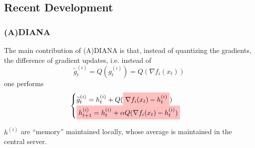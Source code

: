 
\subsection{Recent Development}


\begin{frame}
\frametitle{(A)DIANA}

The main contribution of (A)DIANA \cite{lizhize2020adiana,mishchenko2019diana} is that, instead of quantizing the gradients, the {\color{red} difference of gradient updates}, i.e. instead of
$$\widetilde{g}^{(i)}_t = Q(g^{(i)}_t) = Q(\nabla f_i(x_t))$$
one performs
\begin{equation*}
    \begin{cases}
    \widetilde{g}^{(i)}_t = h^{(i)}_t + Q(\colorbox{pink}{$\nabla f_i(x_t) - h^{(i)}_t$}) \\
    \colorbox{pink}{$h^{(i)}_{t+1} = h^{(i)}_t + \alpha Q(\nabla f_i(x_t) - h^{(i)}_t)$}
    \end{cases}
\end{equation*}

$h^{(i)}$ are ``memory'' maintained locally, whose average is maintained in the central server.


\end{frame}


